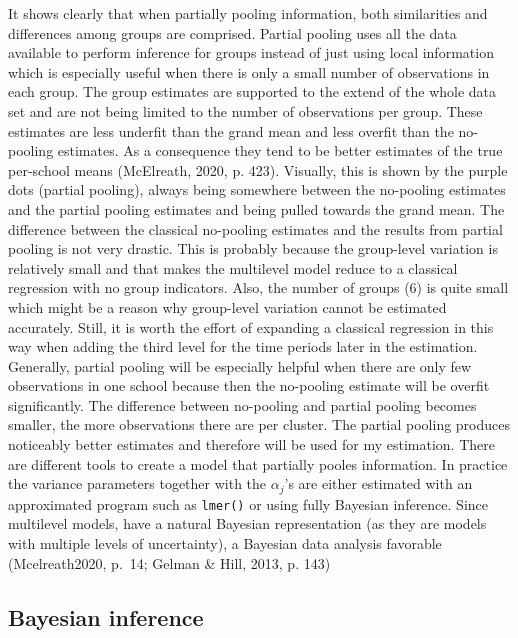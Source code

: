 \documentclass[a4, 12pt]{article}
\begin{document}
It shows clearly that when partially pooling information, both similarities and differences among groups are comprised. Partial pooling uses all the data available to perform inference for groups instead of just using local information which is especially useful when there is only a small number of observations in each group. The group estimates are supported to the extend of the whole data set and are not being limited to the number of observations per group. These estimates are less underfit than the grand mean and less overfit than the no-pooling estimates. As a consequence they tend to be better estimates of the true per-school means (McElreath, 2020, p. 423). Visually, this is shown by the purple dots (partial pooling), always being somewhere between the no-pooling estimates and the partial pooling estimates and being pulled towards the grand mean. The difference between the classical no-pooling estimates and the results from partial pooling is not very drastic. This is probably because the group-level variation is relatively small and that makes the multilevel model reduce to a classical regression with no group indicators. Also, the number of groups (6) is quite small which might be a reason why group-level variation cannot be estimated accurately. Still, it is worth the effort of expanding a classical regression in this way when adding the third level for the time periods later in the estimation. Generally, partial pooling will be especially helpful when there are only few observations in one school because then the no-pooling estimate will be overfit significantly. The difference between no-pooling and partial pooling becomes smaller, the more observations there are per cluster. The partial pooling produces noticeably better estimates and therefore will be used for my estimation. There are different tools to create a model that partially pooles information. In practice the variance parameters together with the \(\alpha_j\)'s are either estimated with an approximated program such as \texttt{lmer()} or using fully Bayesian inference. Since multilevel models, have a natural Bayesian representation (as they are models with multiple levels of uncertainty), a Bayesian data analysis favorable (Mcelreath2020, p.~14; Gelman \& Hill, 2013, p. 143)

\hypertarget{bayesian-inference}{%
\subsection{Bayesian inference}\label{bayesian-inference}}
\end{document}
